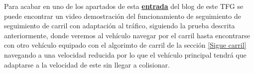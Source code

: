 Para acabar en uno de los apartados de esta \href{https://roboticslaburjc.github.io/2022-tfg-juancamilo-carmona/DEMOS/}{\textbf{entrada}} del blog de este \ac{TFG} se puede encontrar un video demostración del funcionamiento de seguimiento de seguimiento de carril con adaptación al tráfico, siguiendo la prueba descrita anteriormente, donde veremos al vehículo navegar por el carril hasta encontrarse con otro vehículo equipado con el algorimto de carril de la sección \ref{Sigue carril} navegando a una velocidad reducida por lo que el vehículo principal tendrá que adaptarse a la velocidad de este sin llegar a colisionar.







